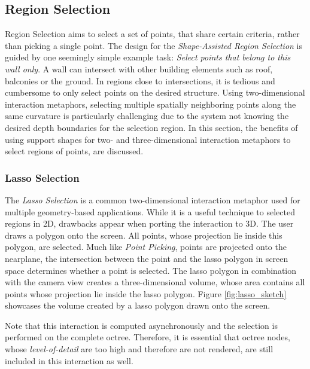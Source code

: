 \subsection{Region Selection}
\label{sec:regionSelection}

Region Selection aims to select a set of points, that share certain criteria, rather than picking a single point. 
The design for the \textit{Shape-Assisted Region Selection} is guided by one seemingly simple example task: \textit{Select points that belong to this wall only}. A wall can intersect with other building elements such as roof, balconies or the ground. In regions close to intersections, it is tedious and cumbersome to only select points on the desired structure. Using two-dimensional interaction metaphors, selecting multiple spatially neighboring points along the same curvature is particularly challenging due to the system not knowing the desired depth boundaries for the selection region. In this section, the benefits of using support shapes for two- and three-dimensional interaction metaphors to select regions of points,  are discussed. 


\subsubsection{Lasso Selection}

The \textit{Lasso Selection} is a common two-dimensional interaction metaphor used for multiple geometry-based applications. While it is a useful technique to selected regions in 2D, drawbacks appear when porting the interaction to 3D. The user draws a polygon onto the screen. All points, whose projection lie inside this polygon, are selected. Much like \textit{Point Picking}, points are projected onto the nearplane, the intersection between the point and the lasso polygon in screen space determines whether a point is selected. The lasso polygon in combination with the camera view creates a three-dimensional volume, whose area contains all points whose projection lie inside the lasso polygon. Figure \ref{fig:lasso_sketch} showcases the volume created by a lasso polygon drawn onto the screen.

Note that this interaction is computed asynchronously and the selection is performed on the complete octree. Therefore, it is essential that octree nodes, whose \textit{level-of-detail} are too high and therefore are not rendered, are still included in this interaction as well. 


